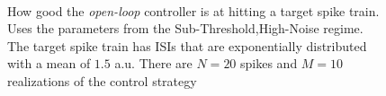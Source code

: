 \documentclass{article}
\begin{document}
\begin{figure}[htp]  
\begin{center}    \\
  \caption[ ]{How good the {\sl open-loop} controller is at hitting a target
  spike train. Uses the parameters from the Sub-Threshold,High-Noise regime. The
  target spike train has ISIs that are exponentially distributed with a
  mean of $1.5$ a.u. There are $N=20$ spikes and $M=10$ realizations of the
  control strategy}
  \label{fig:targettrain_ol_highnoise}
\end{center}
\end{figure}    
\clearpage
\end{document}
